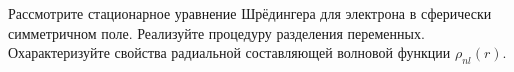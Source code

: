 \documentclass[__main__.tex]{subfiles}
\begin{document}
Рассмотрите стационарное уравнение Шрёдингера для электрона в сферически симметричном поле. Реализуйте процедуру разделения переменных. Охарактеризуйте свойства радиальной составляющей волновой функции $\rho_{nl}(r)$.\\ 

\end{document}
